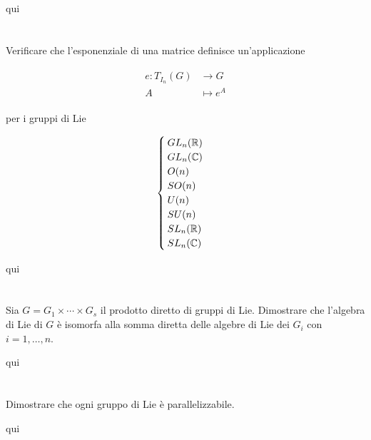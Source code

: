 qui

%

\newpage

%

\section{}\label{es3-10}

\begin{tcolorbox}
	Verificare che l'esponenziale di una matrice definisce un'applicazione
	
	\begin{align}
		\begin{split}
			e : T_{I_{n}}(G) &\to G\\
			A &\mapsto e^{A}
		\end{split}
	\end{align}

	per i gruppi di Lie
	
	\begin{equation}
		\begin{cases}
			GL_{n}(\mathbb{R})\\
			GL_{n}(\mathbb{C})\\
			O(n)\\
			SO(n)\\
			U(n)\\
			SU(n)\\
			SL_{n}(\mathbb{R})\\
			SL_{n}(\mathbb{C})
		\end{cases}
	\end{equation}
\end{tcolorbox}

qui

%

\newpage

%

\section{}\label{es3-11}

\begin{tcolorbox}
	Sia $ G = G_{1} \times \cdots \times G_{s} $ il prodotto diretto di gruppi di Lie. Dimostrare che l'algebra di Lie di $ G $ è isomorfa alla somma diretta delle algebre di Lie dei $ G_{i} $ con $ i=1,\dots,n $.
\end{tcolorbox}

qui

%

\newpage

%

\section{}\label{es3-12}

\begin{tcolorbox}
	Dimostrare che ogni gruppo di Lie è parallelizzabile.
\end{tcolorbox}

qui
